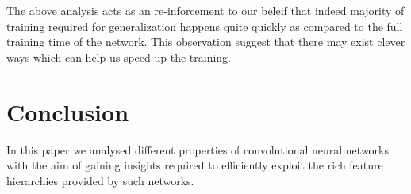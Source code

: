 \documentclass[runningheads]{llncs}
\begin{document}
\setlength{\tabcolsep}{1pt}
\begin{table}[t!]
\begin{center}
\caption{Performance of 50-50 network for detection on pascal-voc-2007 challenge. (l5 is pool-5 and l7 is relu-7)}
\label{table:det-trajectory}
\end{center}
\end{table}
\setlength{\tabcolsep}{1.4pt}

The above analysis acts as an re-inforcement to our beleif that indeed majority of training required for generalization happens quite quickly as compared to the full training time of the network. This observation suggest that there may exist clever ways which can help us speed up the training.

\section{Conclusion}
\label{sec:conclusion}
In this paper we analysed different properties of convolutional neural networks with the aim of gaining insights required to efficiently exploit the rich feature hierarchies provided by such networks.



\end{document}
